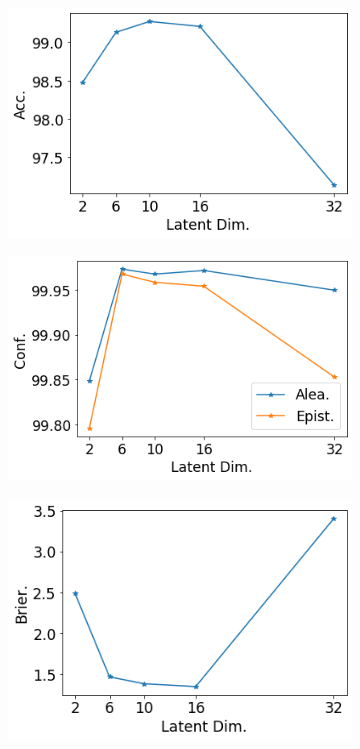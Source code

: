 \begin{figure}[ht]
    \centering
    \begin{subfigure}[t]{0.33 \textwidth}
        \centering
        \includegraphics[width=1. \textwidth]{sections/006_neurips2020/figures/lat_dim_minst_acc.png}
    \end{subfigure}%
    \begin{subfigure}[t]{0.33 \textwidth}
        \centering
        \includegraphics[width=1. \textwidth]{sections/006_neurips2020/figures/lat_dim_minst_conf.png}
    \end{subfigure}%
    \begin{subfigure}[t]{0.33 \textwidth}
        \centering
        \includegraphics[width=1. \textwidth]{sections/006_neurips2020/figures/lat_dim_minst_brier.png}

\end{subfigure}
\end{figure}
